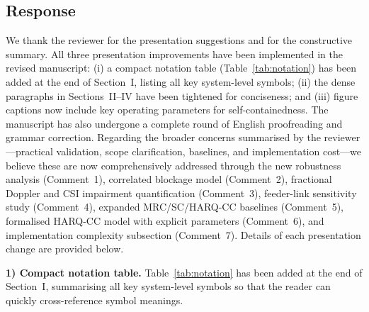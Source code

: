\subsection{Response}

We thank the reviewer for the presentation suggestions and for the constructive summary. All three presentation improvements have been implemented in the revised manuscript: (i) a compact notation table (Table~\ref{tab:notation}) has been added at the end of Section~I, listing all key system-level symbols; (ii) the dense paragraphs in Sections~II--IV have been tightened for conciseness; and (iii) figure captions now include key operating parameters for self-containedness. The manuscript has also undergone a complete round of English proofreading and grammar correction. Regarding the broader concerns summarised by the reviewer---practical validation, scope clarification, baselines, and implementation cost---we believe these are now comprehensively addressed through the new robustness analysis (Comment~1), correlated blockage model (Comment~2), fractional Doppler and CSI impairment quantification (Comment~3), feeder-link sensitivity study (Comment~4), expanded MRC/SC/HARQ-CC baselines (Comment~5), formalised HARQ-CC model with explicit parameters (Comment~6), and implementation complexity subsection (Comment~7). Details of each presentation change are provided below.

\textbf{1) Compact notation table.}
Table~\ref{tab:notation} has been added at the end of Section~I, summarising all key system-level symbols so that the reader can quickly cross-reference symbol meanings.

